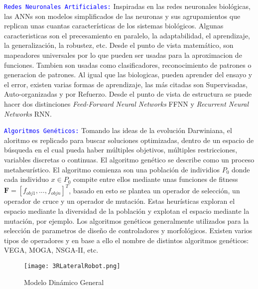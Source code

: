 \documentclass[10pt,onecolumn,twoside,letterpaper]{article}
\newcommand{\myreferences}{../../../doc/review/review/library}
\begin{document}
\par \textcolor{blue}{\texttt{Redes Neuronales Artificiales:}} Inspiradas en las redes neuronales biol\'ogicas, las ANNs son modelos simplificados de las neuronas y sus agrupamientos que replican unas cuantas caracter\'isticas de los sistemas biol\'ogicos. Algunas caracteristicas son el precesamiento en paralelo, la adaptabilidad, el aprendizaje, la generalizaci\'on, la robustez, etc. Desde el punto de vista matem\'atico, son mapeadores universales por lo que pueden ser usadas para la aproximacion de funciones. Tambien son usadas como clasificadores, reconocimiento de patrones o generacion de patrones. Al igual que las biologicas, pueden aprender del ensayo y el error, existen varias formas de aprendizaje, las m\'as citadas son Supervisadas, Auto-organizadas y por Refuerzo. Desde el punto de vista de estructura se puede hacer dos distinciones \emph{Feed-Forward Neural Networks} FFNN y \emph{Recurrent Neural Networks} RNN.
\par \textcolor{blue}{\texttt{Algoritmos Gen\'eticos:}} Tomando las ideas de la evoluci\'on Darwiniana, el aloritmo es replicado para buscar soluciones optimizadas, dentro de un espacio de b\'usqueda en el cual pueda haber m\'ultiples objetivos, m\'ultiples restricciones, variables discretas o continuas. El algoritmo gen\'etico se describe como un proceso metaheur\'istico. El algoritmo comienza son una poblaci\'on de individios $P_0$ donde cada individuo $x \in P_0$ compite entre ellos mediante unas funciones de fitness $\mathbf{F}=[f_{obj1},...,f_{objn}]^T$, basado en esto se plantea un operador de selecci\'on, un operador de cruce y un operador de mutaci\'on. Estas heur\'isticas exploran el espacio mediante la diversidad de la poblaci\'on y explotan el espacio mediante la mutaci\'on, por ejemplo. Los algoritmos gen\'eticos generalmente utilizados para la selecci\'on de parametros de dise\~no de controladores y morfol\'ogicos. Existen varios tipos de operadores y en base a ello el nombre de distintos algoritmos gen\'eticos: VEGA, MOGA, NSGA-II, etc. 
\begin{figure}[H]
  \centering
  \texttt{[image: 3RLateralRobot.png]}
  \caption{Modelo Din\'amico General}
  \label{fig:modelo}
\end{figure}

\end{document}
